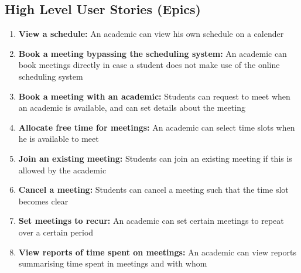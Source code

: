 \documentclass[11pt, a4paper]{article}
\begin{document}
	\subsection{High Level User Stories (Epics)}
	\begin{enumerate}
		\item \textbf{View a schedule: }
		An academic can view his own schedule on a calender
		\item \textbf{Book a meeting bypassing the scheduling system: }
		An academic can book meetings directly in case a student does not make use of the online scheduling system
		\item \textbf{Book a meeting with an academic: }
		Students can request to meet when an academic is available, and can set details about the meeting
		\item \textbf{Allocate free time for meetings: }
		An academic can select time slots when he is available to meet
		\item \textbf{Join an existing meeting: }
		Students can join an existing meeting if this is allowed by the academic
		\item \textbf{Cancel a meeting: }
		Students can cancel a meeting such that the time slot becomes clear
		\item \textbf{Set meetings to recur: }
		An academic can set certain meetings to repeat over a certain period
		\item \textbf{View reports of time spent on meetings: }
		An academic can view reports summarising time spent in meetings and with whom
	\end{enumerate}
\end{document}
